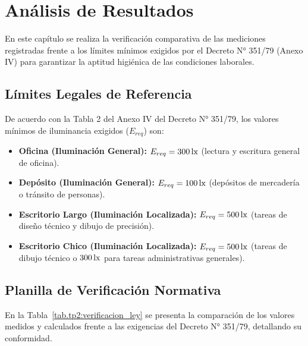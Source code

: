 \chapter{Análisis de Resultados}
\label{sec.tp2:analisis}

En este capítulo se realiza la verificación comparativa de las mediciones registradas frente a los límites mínimos
exigidos por el Decreto N° 351/79 (Anexo IV) para garantizar la aptitud higiénica de las condiciones laborales.

\section{Límites Legales de Referencia}
\label{sec.tp2:limites_legales}

De acuerdo con la Tabla 2 del Anexo IV del Decreto N° 351/79, los valores mínimos de iluminancia exigidos ($E_{req}$) son:
\begin{itemize}
    \item \textbf{Oficina (Iluminación General):} $E_{req} = 300\,\mathrm{lx}$ (lectura y escritura general de oficina).
    \item \textbf{Depósito (Iluminación General):} $E_{req} = 100\,\mathrm{lx}$ (depósitos de mercadería o tránsito de personas).
    \item \textbf{Escritorio Largo (Iluminación Localizada):} $E_{req} = 500\,\mathrm{lx}$ (tareas de diseño técnico y dibujo de precisión).
    \item \textbf{Escritorio Chico (Iluminación Localizada):} $E_{req} = 500\,\mathrm{lx}$ (tareas de dibujo técnico o $300\,\mathrm{lx}$ para tareas administrativas generales).
\end{itemize}

\section{Planilla de Verificación Normativa}
\label{sec.tp2:verificacion_normativa}

En la Tabla~\ref{tab.tp2:verificacion_ley} se presenta la comparación de los valores medidos y calculados frente a las exigencias del Decreto N° 351/79, detallando su conformidad.

